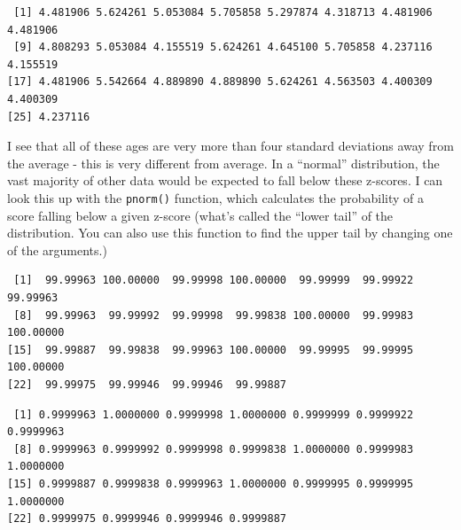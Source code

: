 \documentclass[
  letterpaper,
  DIV=11,
  numbers=noendperiod,
  oneside]{scrreprt}
\newenvironment{Shaded}{\begin{snugshade}}{\end{snugshade}}
\newcommand{\DecValTok}[1]{\textcolor[rgb]{0.68,0.00,0.00}{#1}}
\newcommand{\FunctionTok}[1]{\textcolor[rgb]{0.28,0.35,0.67}{#1}}
\newcommand{\NormalTok}[1]{\textcolor[rgb]{0.00,0.23,0.31}{#1}}
\newcommand{\SpecialCharTok}[1]{\textcolor[rgb]{0.37,0.37,0.37}{#1}}
\begin{document}
\begin{verbatim}
 [1] 4.481906 5.624261 5.053084 5.705858 5.297874 4.318713 4.481906 4.481906
 [9] 4.808293 5.053084 4.155519 5.624261 4.645100 5.705858 4.237116 4.155519
[17] 4.481906 5.542664 4.889890 4.889890 5.624261 4.563503 4.400309 4.400309
[25] 4.237116
\end{verbatim}

I see that all of these ages are very more than four standard deviations
away from the average - this is very different from average. In a
``normal'' distribution, the vast majority of other data would be
expected to fall below these z-scores. I can look this up with the
\texttt{pnorm()} function, which calculates the probability of a score
falling below a given z-score (what's called the ``lower tail'' of the
distribution. You can also use this function to find the upper tail by
changing one of the arguments.)

\begin{Shaded}
\end{Shaded}

\begin{verbatim}
 [1]  99.99963 100.00000  99.99998 100.00000  99.99999  99.99922  99.99963
 [8]  99.99963  99.99992  99.99998  99.99838 100.00000  99.99983 100.00000
[15]  99.99887  99.99838  99.99963 100.00000  99.99995  99.99995 100.00000
[22]  99.99975  99.99946  99.99946  99.99887
\end{verbatim}

\begin{Shaded}
\end{Shaded}

\begin{verbatim}
 [1] 0.9999963 1.0000000 0.9999998 1.0000000 0.9999999 0.9999922 0.9999963
 [8] 0.9999963 0.9999992 0.9999998 0.9999838 1.0000000 0.9999983 1.0000000
[15] 0.9999887 0.9999838 0.9999963 1.0000000 0.9999995 0.9999995 1.0000000
[22] 0.9999975 0.9999946 0.9999946 0.9999887
\end{verbatim}
\end{document}
